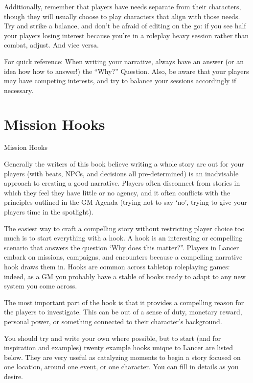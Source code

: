 Additionally, remember that players have needs separate from their characters, though they will
usually choose to play characters that align with those needs. Try and strike a balance, and don’t
be afraid of editing on the go: if you see half your players losing interest because you’re in a
roleplay heavy session rather than combat, adjust. And vice versa.


For quick reference: When writing your narrative, always have an answer (or an idea how how to
answer!) the “Why?” Question. Also, be aware that your players may have competing interests,
and try to balance your sessions accordingly if necessary.



\section{Mission Hooks}

                                           Mission Hooks

Generally the writers of this book believe writing a whole story arc out for your players (with
beats, NPCs, and decisions all pre-determined) is an inadvisable approach to creating a good
narrative. Players often disconnect from stories in which they feel they have little or no agency,
and it often conflicts with the principles outlined in the GM Agenda (trying not to say ‘no’, trying
to give your players time in the spotlight).


The easiest way to craft a compelling story without restricting player choice too much is to start
everything with a hook. A hook is an interesting or compelling scenario that answers the
question ‘Why does this matter?”. Players in Lancer embark on missions, campaigns, and
encounters because a compelling narrative hook draws them in. Hooks are common across
tabletop roleplaying games: indeed, as a GM you probably have a stable of hooks ready to adapt
to any new system you come across.


The most important part of the hook is that it provides a compelling reason for the players
to investigate. This can be out of a sense of duty, monetary reward, personal power, or
something connected to their character’s background.


You should try and write your own where possible, but to start (and for inspiration and examples)
twenty example hooks unique to Lancer are listed below. They are very useful as catalyzing
moments to begin a story focused on one location, around one event, or one character. You can
fill in details as you desire.


